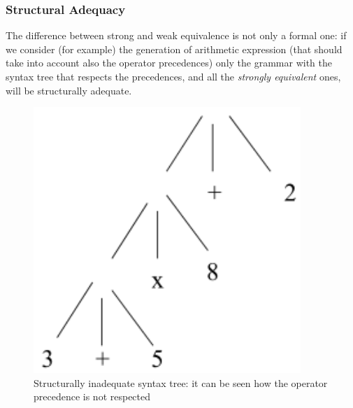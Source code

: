 		\subsubsection{Structural Adequacy}
			The difference between strong and weak equivalence is not only a formal one: if we consider (for example) the generation of arithmetic expression (that should take into account also the operator precedences) only the grammar with the syntax tree that respects the precedences, and all the \emph{strongly equivalent} ones, will be structurally adequate.\\
				\begin{figure}
					\centering
					\begin{minipage}{0.45\textwidth}
						\centering
						\includegraphics[width=0.9\textwidth]{./images/structAdeq1.png}
				    	\caption{Structurally inadequate syntax tree: it can be seen how the operator precedence is not respected}
					\end{minipage}\hfill
					\begin{minipage}{0.45\textwidth}
						\centering

\end{minipage}
\end{figure}
